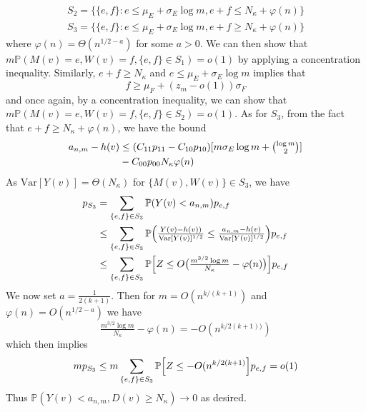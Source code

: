 \documentclass[final]{IEEEtran}
\theoremstyle{definition}
\begin{document}
\begin{IEEEproof}
\begin{IEEEproof}[Eq.~\eqref{eq:30}]
\begin{gather}
    S_2 = \{ \{e,f\} \colon  e \leq
        \mu_E + \sigma_E \log{m},e + f \leq
        N_\kappa + \varphi(n)\} \\
    S_3 = \{ \{e,f\} \colon e \leq \mu_E + \sigma_E \log{m}, e + f \geq
        N_\kappa + \varphi(n)\}
\end{gather}
where $\varphi(n) = \Theta(n^{1/2 - a})$ for some $a > 0$. We can then
show that $m\mathbb{P}(M(v) = e,
W(v) =f, \{e,f\} \in S_1) = o(1)$ by applying a concentration
inequality. Similarly, $e + f \geq N_{\kappa}$ and $e \leq \mu_{E}
+ \sigma_{E} \log{m}$ implies that
\begin{equation}
  \label{eq:33}
  f \geq \mu_{F} + (z_{m} - o(1)) \sigma_F 
\end{equation}
and once again, by a concentration inequality, we can show that $m
\mathbb{P}(M(v) = e, W(v) = f, \{e,f\} \in S_2) = o(1)$. As for
$S_3$, from the fact that $e + f \geq N_{\kappa} + \varphi(n)$, we have the bound
  \begin{equation}
    \begin{split}
    a_{n,m} - h(v) &\leq (C_{11} p_{11} - C_{10} p_{10})[m \sigma_E
    \log{m} + \tbinom{\log{m}}{2}] \\ &- C_{00}p_{00} N_\kappa \varphi(n)
    \end{split}
  \end{equation}
  As $\mathrm{Var}[Y(v)] = \Theta(N_\kappa)$ for $\{M(v), W(v)\} \in
  S_3$, we have
  \begin{equation}
    \label{eq:39}
    \begin{split}
      p_{S_3} &= \sum_{\{e,f\} \in S_3} \mathbb{P}( Y(v) < a_{n,m}) p_{e,f} 
      \\ &\leq \sum_{\{e,f\} \in S_3} \mathbb{P}\Bigl(\tfrac{Y(v) - h(v))}{\mathrm{Var}[Y(v)]^{1/2}} \leq \tfrac{a_{n,m} -
      h(v)}{\mathrm{Var}[Y(v)]^{1/2}}\Bigr)p_{e,f} \\
    &\leq \sum_{\{e,f\} \in S_3} \mathbb{P}\Bigl[Z \leq
    O\bigl(\tfrac{m^{3/2} \log m}{N_{\kappa}} - \varphi(n)\bigr)\Bigr] p_{e,f}
    \end{split}
  \end{equation}
  We now set $a = \tfrac{1}{2(k+1)}$. Then for $m =
  O(n^{k/(k+1)})$ and $\varphi(n) = O(n^{1/2 - a})$ we have
  \begin{equation}
    \label{eq:41}
    \tfrac{m^{3/2} \log m}{N_\kappa} - \varphi(n) =
    -O(n^{k/2(k+1))})
  \end{equation}
  which then implies
  \begin{equation}
    \label{eq:44}
    m p_{S_3} \leq m \sum_{\{e,f\} \in S_3} \mathbb{P} \Bigl[Z \leq
    - O(n^{k/2(k+1)}\Bigr] p_{e,f} = o(1)
  \end{equation}
  Thus $\mathbb{P}(Y(v) < a_{n,m}, D(v) \geq
      N_{\kappa}) \rightarrow 0$ as desired.
\end{IEEEproof}

\end{IEEEproof}

\end{document}
